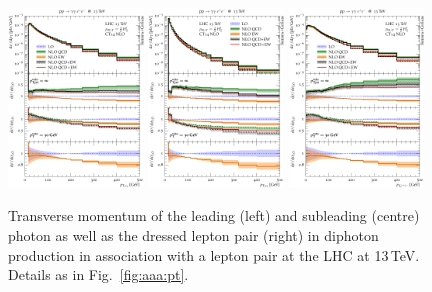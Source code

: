 \begin{figure}[t!]
  \centering
  \includegraphics[width=0.32\textwidth]{figs_aaz/pT_y1}
  \includegraphics[width=0.32\textwidth]{figs_aaz/pT_y2}
  \includegraphics[width=0.32\textwidth]{figs_aaz/pT_l1l2_comb_log}
  \caption{
    Transverse momentum of the leading (left) and subleading (centre) 
    photon as well as the dressed lepton pair (right) 
    in diphoton production in association with a lepton pair 
    at the LHC at 13\,TeV. 
    Details as in Fig.\ \ref{fig:aaa:pt}.
    \label{fig:aaz:pt}
  }
\end{figure}

